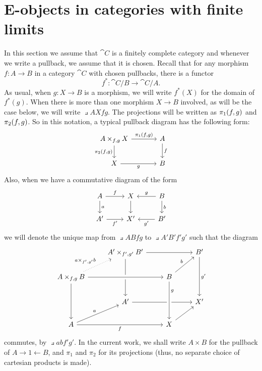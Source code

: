\section{E-objects in categories with finite limits}
In this section we assume that $\cat{C}$ is a finitely complete category and
whenever we write a pullback, we assume that it is chosen. Recall that for
any morphism $f:A\to B$ in a category $\cat{C}$ with chosen pullbacks, there
is a functor
\begin{equation*}
f^\ast : \cat{C}/B\to\cat{C}/A.
\end{equation*}
As usual, when $g:X\to B$ is a morphism, we will write $f^\ast(X)$ for the
domain of $f^\ast(g)$. When there is more than one morphism $X\to B$ involved,
as will be the case below, we will write $\pullback{A}{X}{f}{g}$. The projections
will be written as $\pi_{1}(f,g)$ and $\pi_{2}(f,g)$. So in this notation, a
typical pullback diagram has the following form:
\begin{equation*}
\begin{tikzcd}[column sep=large]
\pullback{A}{X}{f}{g}
  \ar{r}{\pullbackpr{1}{f}{g}}
  \ar{d}[swap]{\pullbackpr{2}{f}{g}}
  &
A \ar{d}{f}
  \\
X \ar{r}[swap]{g}
  &
B
\end{tikzcd}
\end{equation*}
Also, when we have a commutative diagram of the form
\begin{equation*}
\begin{tikzcd}
A \ar{r}{f}
  \ar{d}{a}
  &
X \ar{d}
  & 
B \ar{l}[swap]{g}
  \ar{d}{b}
  \\
A'
  \ar{r}[swap]{f'}
  &
X'
  &
B'
  \ar{l}{g'}
\end{tikzcd}
\end{equation*}
we will denote the unique map from $\pullback{A}{B}{f}{g}$ to $\pullback{A'}{B'}{f'}{g'}$
such that the diagram
\begin{equation*}
\begin{tikzcd}
  {}
  & 
\pullback{A'}{B'}{f'}{g'}
  \ar{dd}
  \ar{rr}
  &
  &
B'
  \ar{dd}{g'}
  \\
\pullback{A}{B}{f}{g}
  \ar{dd}
  \ar[crossing over]{rr}
  \ar[dotted]{ur}{\pullback{a}{b}{f'}{g'}}
  &
  &
B \ar{ur}{b}
  \\
  {}
  &
A'
  \ar{rr}
  &
  &
X'
  \\
A \ar{rr}[swap]{f}
  \ar{ur}{a}
  &
  &
X \ar[crossing over,leftarrow]{uu}[near end,swap]{g}
  \ar{ur}
\end{tikzcd}
\end{equation*}
commutes, by $\pullback{a}{b}{f'}{g'}$. In the current work, we shall
write $A\times B$ for the pullback of $A\rightarrow 1\leftarrow B$, and
$\pi_1$ and $\pi_2$ for its projections (thus, no separate choice of
cartesian products is made).


